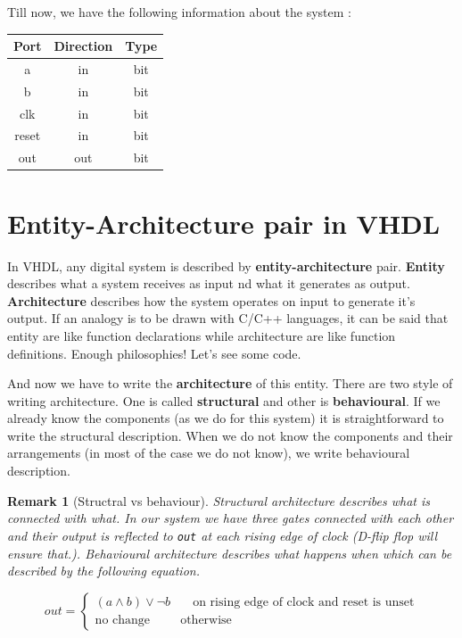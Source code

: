 \documentclass[a4paper,10pt]{article}
\newtheorem{remark}{Remark}
\begin{document}
  Till now, we have the following information about the system :

  \begin{table}[h]
    \centering
  \begin{tabular}{c|c|c}
    Port & Direction & Type \\
    \hline 
    a & in & bit \\
    b & in & bit \\ 
    clk & in & bit \\ 
    reset & in & bit \\ 
    out & out & bit \\
    \hline
  \end{tabular}
\end{table}


\section{Entity-Architecture pair in VHDL}
  
In VHDL, any digital system is described by \textbf{entity-architecture} pair.
\textbf{Entity} describes what a system receives as input nd what it generates
as output. \textbf{Architecture} describes how the system operates on input to
generate it's output. If an analogy is to be drawn with C/C++ languages, it can
be said that entity are like function declarations while architecture are like
function definitions. Enough philosophies! Let's see some code.



And now we have to write the \textbf{architecture} of this entity. There are two
style of writing architecture. One is called \textbf{structural} and other is
\textbf{behavioural}. If we already know the components (as we do for this
system) it is straightforward to write the structural description. When we do
not know the components and their arrangements (in most of the case we do not
know), we write behavioural description. 

\begin{remark}[Structral vs behaviour]
 
  Structural architecture describes \emph{what is connected with what}. In our
  system we have three gates connected with each other and their output is
  reflected to \texttt{out} at each rising edge of clock (D-flip flop will
  ensure that.). Behavioural architecture describes \emph{what happens when}
  which can be described by the following equation.

  \begin{equation}
  out = 
  \begin{cases}
    (a \land b) \lor \neg b & \quad \text{on rising edge of clock and reset
    is unset}\\
    \text{no change} & \text{otherwise} 
  \end{cases}
  \end{equation}
\end{remark}
\end{document}
